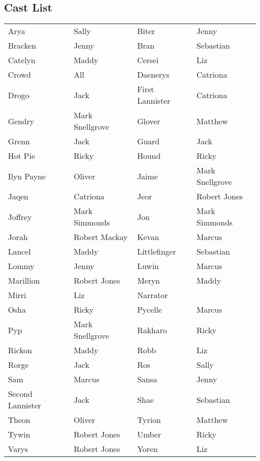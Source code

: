 \subsection*{Cast List}
\begin{tabular}{ll|ll}\\
Arya & Sally &  Biter & Jenny\\
Bracken & Jenny &  Bran & Sebastian\\
Catelyn & Maddy &  Cersei & Liz\\
Crowd & All &  Daenerys & Catriona\\
Drogo & Jack &  First Lannister & Catriona\\
Gendry & Mark Snellgrove &  Glover & Matthew\\
Grenn & Jack &  Guard & Jack\\
Hot Pie & Ricky &  Hound & Ricky\\
Ilyn Payne & Oliver &  Jaime & Mark Snellgrove\\
Jaqen & Catriona &  Jeor & Robert Jones\\
Joffrey & Mark Simmonds &  Jon & Mark Simmonds\\
Jorah & Robert Mackay &  Kevan & Marcus\\
Lancel & Maddy &  Littlefinger & Sebastian\\
Lommy & Jenny &  Luwin & Marcus\\
Marillion & Robert Jones &  Meryn & Maddy\\
Mirri & Liz &  Narrator & \\
Osha & Ricky &  Pycelle & Marcus\\
Pyp & Mark Snellgrove &  Rakharo & Ricky\\
Rickon & Maddy &  Robb & Liz\\
Rorge & Jack &  Ros & Sally\\
Sam & Marcus &  Sansa & Jenny\\
Second Lannister & Jack &  Shae & Sebastian\\
Theon & Oliver &  Tyrion & Matthew\\
Tywin & Robert Jones &  Umber & Ricky\\
Varys & Robert Jones &  Yoren & Liz\\
\end{tabular}
